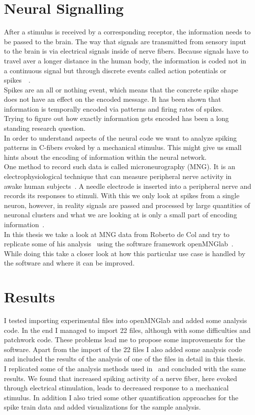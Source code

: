 \section{Neural Signalling}
After a stimulus is received by a corresponding receptor, the information needs to be passed to the brain.
The way that signals are transmitted from sensory input to the brain is via electrical signals inside of nerve fibers. Because signals have to travel aver a longer distance in the human body, the information is coded not in a continuous signal but through discrete events called action potentials or spikes~\cite{rieke1999spikes}~\cite{spikeGeneral}.\\
Spikes are an all or nothing event, which means that the concrete spike shape does not have an effect on the encoded message. It has been shown that information is temporally encoded via patterns and firing rates of spikes.\\
Trying to figure out how exactly information gets encoded has been a long standing research question.\\
In order to understand aspects of the neural code we want to analyze spiking patterns in C-fibers evoked by a mechanical stimulus. This might give us small hints about the encoding of information within the neural network. \\
One method to record such data is called microneurography (MNG). It is an electrophysiological technique that can measure peripheral nerve activity in awake human subjects~\cite{namer2009translational}. A needle electrode is inserted into a peripheral nerve and records its responses to stimuli. With this we only look at spikes from a single neuron, however, in reality signals are passed and processed by large quantities of neuronal clusters and what we are looking at is only a small part of encoding information~\cite{spikeGeneral}.\\
In this thesis we take a look at MNG data from Roberto de Col and try to replicate some of his analysis~\cite{roberto} using the software framework openMNGlab~\cite{schlebusch_openmnglab_2021}. While doing this take a closer look at how this particular use case is handled by the software and where it can be improved.

\section{Results}
I tested importing experimental files into openMNGlab and added some analysis code. In the end I managed to import 22 files, although with some difficulties and patchwork code. These problems lead me to propose some improvements for the software. Apart from the import of the 22 files I also added some analysis code and included the results of the analysis of one of the files in detail in this thesis.\\
I replicated some of the analysis methods used in~\cite{roberto} and concluded with the same results. We found that increased spiking activity of a nerve fiber, here evoked through electrical stimulation, leads to decreased response to a mechanical stimulus. In addition I also tried some other quantification approaches for the spike train data and added visualizations for the sample analysis.

